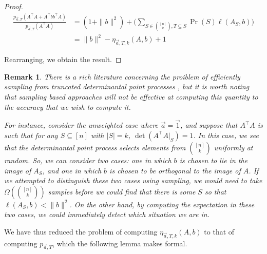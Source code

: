 \documentclass{amsart}
\newtheorem{remark}[thm]{Remark}
\theoremstyle{definition}
\numberwithin{equation}{section}
\begin{document}
\begin{proof}
    \begin{align*}
        \frac{p_{\vec{a}, T}(A^{\intercal}A + A^{\intercal}bb^{\intercal}A)}{p_{\vec{a}, T}(A^{\intercal}A)} &= (1+\|b\|^2) + \big(\sum_{S \in \binom{[n]}{k}, T \subseteq S}\Pr(S)\ell(A_S,b)\big)\\
                                                                                                      &= \|b\|^2 - 
                                                                                                      \eta_{\vec{a}, T, k}(A, b) + 1
    \end{align*}

    Rearranging, we obtain the result.
    
\end{proof}
\begin{remark}
    There is a rich literature concerning the proiblem of efficiently sampling from truncated determinantal point processes \cite{anari2016monte}, but it is worth noting that sampling based approaches will not be effective at computing this quantity to the accuracy that we wish to compute it.

   For instance, consider the unweighted case where $\vec{a} = \vec{1}$, and suppose that $A^{\intercal}A$ is such that for any $S \subseteq [n]$ with $|S| = k$, $\det(A^{\intercal}A|_S) = 1$.
   In this case, we see that the determinantal point process selects elements from $\binom{[n]}{k}$ uniformly at random.
   So, we can consider two cases: one in which $b$ is chosen to lie in the image of $A_S$, and one in which $b$ is chosen to be orthogonal to the image of $A$.
   If we attempted to distinguish these two cases using sampling, we would need to take $\Omega(\binom{[n]}{k})$ samples before we could find that there is some $S$ so that $\ell(A_S, b) < \|b\|^2$.
   On the other hand, by computing the expectation in these two cases, we could immediately detect which situation we are in.
\end{remark}

We have thus reduced the problem of computing $\eta_{\vec{a}, T, k}(A, b)$ to that of computing $p_{\vec{a}, T}$, which the following lemma makes formal.
\end{document}

